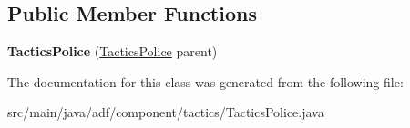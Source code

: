 \subsection*{Public Member Functions}
\begin{DoxyCompactItemize}
\item 
\hypertarget{classadf_1_1component_1_1tactics_1_1TacticsPolice_a2064eb132cdc6da417b520bae9c63df3}{}\label{classadf_1_1component_1_1tactics_1_1TacticsPolice_a2064eb132cdc6da417b520bae9c63df3} 
{\bfseries Tactics\+Police} (\hyperlink{classadf_1_1component_1_1tactics_1_1TacticsPolice}{Tactics\+Police} parent)
\end{DoxyCompactItemize}


The documentation for this class was generated from the following file\+:\begin{DoxyCompactItemize}
\item 
src/main/java/adf/component/tactics/Tactics\+Police.\+java\end{DoxyCompactItemize}
